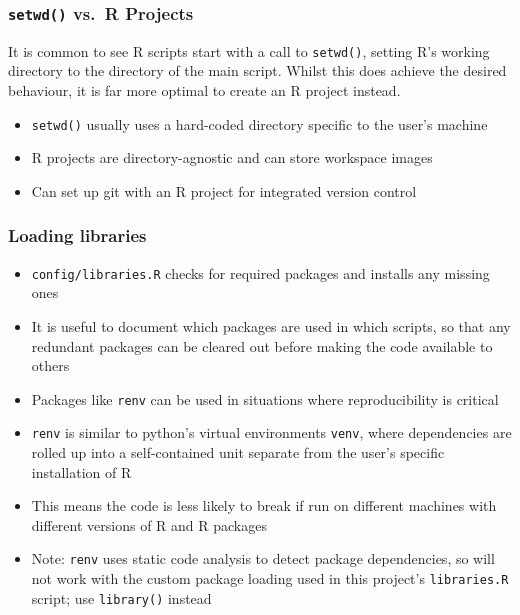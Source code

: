 \documentclass[
]{article}
\providecommand{\tightlist}{%
  \setlength{\itemsep}{0pt}\setlength{\parskip}{0pt}}
\begin{document}
\hypertarget{setwd-vs.-r-projects}{%
\subsubsection{\texorpdfstring{\texttt{setwd()} vs.~R
Projects}{setwd() vs.~R Projects}}\label{setwd-vs.-r-projects}}

It is common to see R scripts start with a call to \texttt{setwd()},
setting R's working directory to the directory of the main script.
Whilst this does achieve the desired behaviour, it is far more optimal
to create an R project instead.

\begin{itemize}
\tightlist
\item
  \texttt{setwd()} usually uses a hard-coded directory specific to the
  user's machine
\item
  R projects are directory-agnostic and can store workspace images
\item
  Can set up git with an R project for integrated version control
\end{itemize}

\hypertarget{loading-libraries}{%
\subsubsection{Loading libraries}\label{loading-libraries}}

\begin{itemize}
\item
  \texttt{config/libraries.R} checks for required packages and installs
  any missing ones
\item
  It is useful to document which packages are used in which scripts, so
  that any redundant packages can be cleared out before making the code
  available to others
\item
  Packages like \texttt{renv} can be used in situations where
  reproducibility is critical
\item
  \texttt{renv} is similar to python's virtual environments
  \texttt{venv}, where dependencies are rolled up into a self-contained
  unit separate from the user's specific installation of R
\item
  This means the code is less likely to break if run on different
  machines with different versions of R and R packages
\item
  Note: \texttt{renv} uses static code analysis to detect package
  dependencies, so will not work with the custom package loading used in
  this project's \texttt{libraries.R} script; use \texttt{library()}
  instead
\end{itemize}
\end{document}

